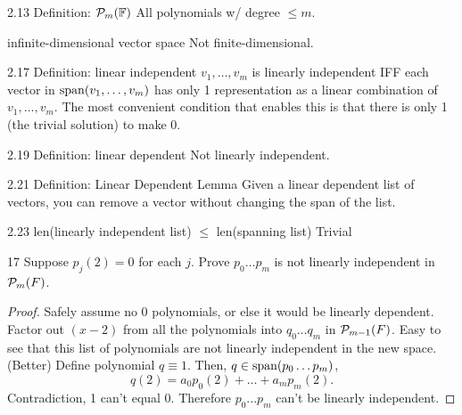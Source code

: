 \documentclass[12pt, letterpaper]{article}
\begin{document}
\begin{imp}{2.13 Definition: $\mathcal{P}_m(\mathbb{F})$}
All polynomials w/ degree $\leq m$.
\end{imp}

\begin{imp}{infinite-dimensional vector space}
Not finite-dimensional.
\end{imp}

\begin{imp}{2.17 Definition: linear independent}
$v_1,\dots,v_m$ is linearly independent IFF each vector in
$\operatorname{span}(v_1,\dots,v_m)$ has only 1 representation as a linear combination of
$v_1,\dots,v_m$. The most convenient condition that enables this is that there is only 1 
(the trivial solution) to make 0.
\end{imp}

\begin{imp}{2.19 Definition: linear dependent}
Not linearly independent.
\end{imp}

\begin{imp}{2.21 Definition: Linear Dependent Lemma}
Given a linear dependent list of vectors, you can remove a vector
without changing the span of the list.
\end{imp}

\begin{imp}{2.23 len(linearly independent list) $\leq$ len(spanning list)}
Trivial
\end{imp}

\begin{problem}{17}
Suppose $p_j(2)=0$ for each $j$. Prove $p_0\dots p_m$ is not linearly independent
in $\mathcal{P}_m(F)$.
\end{problem}
\begin{proof}
Safely assume no 0 polynomials, or else it would be linearly dependent.
Factor out $(x-2)$ from all the polynomials into
$q_0\dots q_m$ in $\mathcal{P}_{m-1}(F)$. Easy to see that this 
list of polynomials are not linearly independent in the new space.
\\(Better) Define polynomial $q\equiv1$. Then, $q\in\operatorname{span}(p_0\dots p_m)$,
$$q(2)=a_0p_0(2)+\dots+a_mp_m(2).$$
Contradiction, 1 can't equal 0. Therefore $p_0...p_m$ can't be linearly independent.
\end{proof}
\end{document}
